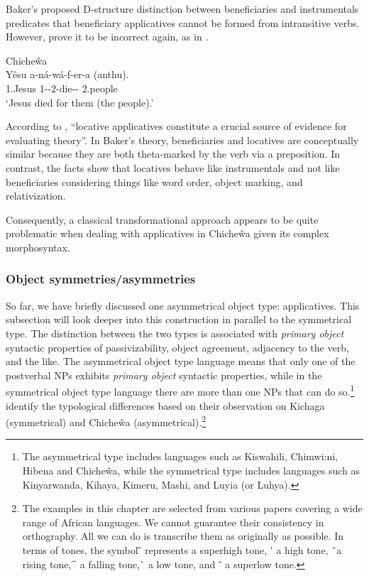\documentclass[output=paper,hidelinks]{langscibook}
\begin{document}

Baker’s proposed D-structure distinction between beneficiaries and instrumentals predicates that beneficiary applicatives cannot be formed from intransitive verbs. However, \citet{AlsinaMchombo1990} prove it to be incorrect again, as in .

\ea\label{ex:African:17} Chiche\^wa\\
    \gll Y\^{e}su       a-ná-wá-f-er-a                       (anthu).\\
        1.Jesus  1{\SBJ}-{\PST}-2{\OBJ}-die-{}-  \phantom{(}2.people\\
    \glt ‘Jesus died for them (the people).’
    \z


According to \citet[503]{AlsinaMchombo1990}, “locative applicatives constitute a crucial source of evidence for evaluating  theory”. In Baker’s theory, beneficiaries and locatives are conceptually similar because they are both theta-marked by the verb via a preposition. In contrast, the facts show that locatives behave like instrumentals and not like beneficiaries considering things like word order, object marking, and relativization.

Consequently, a classical transformational approach appears to be quite problematic when dealing with applicatives in Chiche\^wa given its complex morpho\-syntax.

\subsubsection{Object symmetries/asymmetries}


So far, we have briefly discussed one asymmetrical object type:
applicatives. This subsection will look deeper into this construction
in parallel to the symmetrical type. The distinction between the two
types is associated with \textit{primary object} syntactic properties
of passivizability, object agreement, adjacency to the verb, and the
like. The asymmetrical object type language means that only one of the
postverbal NPs exhibits \textit{primary object} syntactic properties,
while in the symmetrical object type language there are more than one
NPs that can do so.\footnote{The asymmetrical type includes languages
such as Kiswahili, Chimwi:ni, Hibena and Chiche\^wa, while the
symmetrical type includes languages such as Kinyarwanda, Kihaya,
Kimeru, Mashi, and Luyia (or Luhya).} \citet[149--157]{BresMosh90}
identify the typological differences based on their observation on
Kichaga (symmetrical) and Chiche\^wa (asymmetrical).\footnote{The examples in this chapter are selected from
various papers covering a wide range of African languages. We cannot
guarantee their consistency in orthography. All we can do is
transcribe them as originally as possible. In terms of tones, the
symbol \H{}  represents a superhigh tone, \'{} a high tone, ˇa rising
tone,\^{}  a falling tone,\`{} a low tone, and ˉ a superlow tone.}
\end{document}
